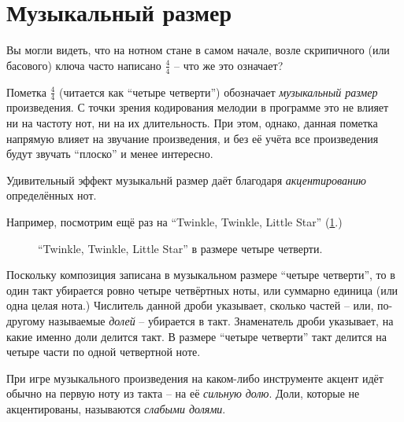 \documentclass[a4paper,twoside]{book}
\begin{document}
\section{Музыкальный размер}

Вы могли видеть, что на нотном стане в самом начале, возле скрипичного (или
басового) ключа часто написано $\frac{4}{4}$ -- что же это означает?

Пометка $\frac{4}{4}$ (читается как ``четыре четверти'') обозначает
\emph{музыкальный размер} произведения.  С точки зрения кодирования мелодии в
программе это не влияет ни на частоту нот, ни на их длительность.  При этом,
однако, данная пометка напрямую влияет на звучание произведения, и без её учёта
все произведения будут звучать ``плоско'' и менее интересно.

Удивительный эффект музыкальнй размер даёт благодаря \emph{акцентированию}
определённых нот.

Например, посмотрим ещё раз на ``Twinkle, Twinkle, Little Star''
(\ref{fig:lilypond-musical-scale-example-1}.)

\begin{figure}[ht]
  \caption{``Twinkle, Twinkle, Little Star'' в размере четыре четверти.}
  \centering
  \label{fig:lilypond-musical-scale-example-1}
\end{figure}

Поскольку композиция записана в музыкальном размере ``четыре четверти'', то в
один такт убирается ровно четыре четвёртных ноты, или суммарно единица (или одна
целая нота.)  Числитель данной дроби указывает, сколько частей -- или, по-другому
называемые \emph{долей} -- убирается в такт.  Знаменатель дроби указывает, на
какие именно доли делится такт.  В размере ``четыре четверти'' такт делится на
четыре части по одной четвертной ноте.

При игре музыкального произведения на каком-либо инструменте акцент идёт обычно
на первую ноту из такта -- на её \emph{сильную долю}.  Доли, которые не
акцентированы, называются \emph{слабыми долями}.
\end{document}
